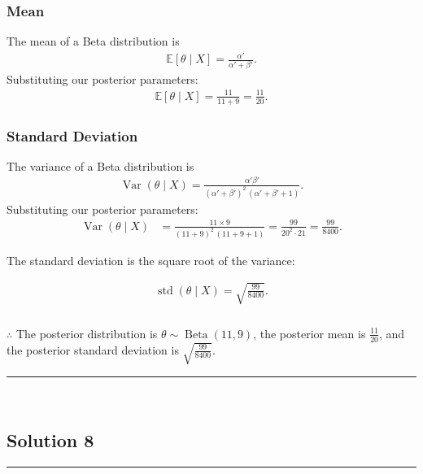 \documentclass{article}
\begin{document}
\subsubsection*{Mean}
The mean of a Beta distribution is
\begin{align*}
    \mathbb{E}[\theta \mid X] = \frac{\alpha'}{\alpha' + \beta'}.
\end{align*}
Substituting our posterior parameters:
\begin{align*}
    \mathbb{E}[\theta \mid X] = \frac{11}{11 + 9} = \frac{11}{20}.
\end{align*}

\subsubsection*{Standard Deviation}
The variance of a Beta distribution is
\begin{align*}
    \operatorname{Var}(\theta \mid X) = \frac{\alpha' \beta'}{(\alpha' + \beta')^2 \, (\alpha' + \beta' + 1)}.
\end{align*}
Substituting our posterior parameters:
\begin{align*}
    \operatorname{Var}(\theta \mid X) 
    &= \frac{11 \times 9}{(11 + 9)^2 \, (11 + 9 + 1)}
     = \frac{99}{20^2 \cdot 21}
     = \frac{99}{8400}.
\end{align*}
\begin{flushleft}
The standard deviation is the square root of the variance:
\end{flushleft}
\begin{align*}
    \operatorname{std}(\theta \mid X) = \sqrt{\frac{99}{8400}}.
\end{align*}

\subsubsection*{\normalfont}{$\therefore$ The posterior distribution is $\theta \sim \operatorname{Beta}(11, 9)$, the posterior mean is $\frac{11}{20}$, and the posterior standard deviation is $\sqrt{\frac{99}{8400}}$.} \\

\noindent\rule{\textwidth}{0.4pt}\\

\newpage

\subsection*{Solution 8}
\noindent\rule{\textwidth}{0.4pt}\\
\end{document}
